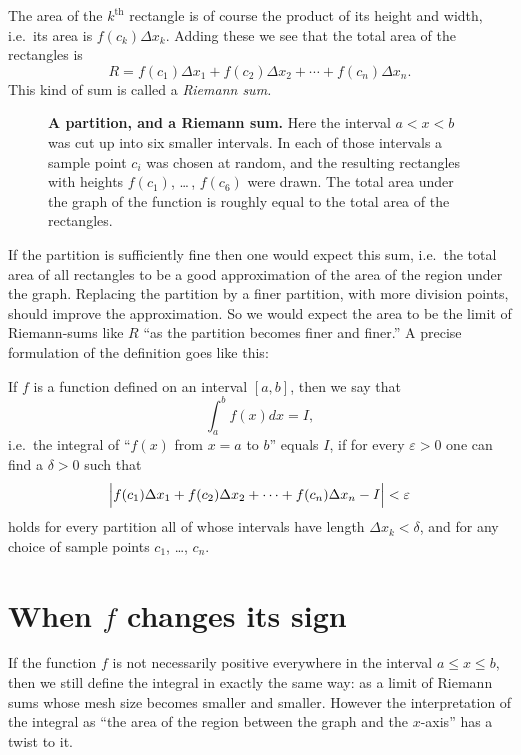 The area of the $k^{\textrm{th}}$ rectangle is of course the product of its
height and width, i.e.\ its area is $f(c_k)\Delta x_k$.  Adding these we see
that the total area of the rectangles is
\begin{equation}\label{eq:09riemann-sum}
  R = f(c_1)\Delta x_1 + f(c_2) \Delta x_2 + \cdots + f(c_n)\Delta x_n.
\end{equation}
This kind of sum is called a \emph{Riemann sum.}
\begin{figure}[t]
  \centering
  
  \bigskip
  
  \caption{\textbf{A partition, and a Riemann sum. } Here the interval
    $a<x<b$ was cut up into six smaller intervals.  In each of
    those intervals a sample point $c_i$ was chosen at random, and the
    resulting rectangles with heights $f(c_1)$, \ldots\,, $f(c_6)$ were
    drawn.  The total area under the graph of the function is roughly
    equal to the total area of the rectangles.  }
  \label{fig:08Riemann}
\end{figure}

If the partition is sufficiently fine then one would expect this sum, i.e.\ the
total area of all rectangles to be a good approximation of the area of the
region under the graph.  Replacing the partition by a finer partition, with more
division points, should improve the approximation.  So we would expect the area
to be the limit of Riemann-sums like $R$ ``as the partition becomes finer and
finer.'' A precise formulation of the definition goes like this:

\begin{definition}
  If $f$ is a function defined on an interval $[a, b]$, then we say
  that
  \[
  \int_a^b f(x) dx = I,
  \]
  i.e.\ the integral of ``$f(x)$ from $x=a$ to $b$'' equals $I$, if
  for every $\varepsilon >0$ one can find a $\delta>0$ such that
  \[
  \Bigl|f(c_1)\Delta x_1 + f(c_2) \Delta x_2 + \cdots + f(c_n)\Delta
  x_n -I\Bigr|<\varepsilon
  \]
  holds for every partition all of whose intervals have length $\Delta
  x_k<\delta$, and for any choice of sample points $c_1$, \dots , $c_n$. 
\end{definition}

\section{When $f$ changes its sign}
If the function $f$ is not necessarily positive everywhere in the interval
$a\leq x\leq b$, then we still define the integral in exactly the same way: as a
limit of Riemann sums whose mesh size becomes smaller and smaller.  However the
interpretation of the integral as ``the area of the region between the graph and
the $x$-axis'' has a twist to it.

